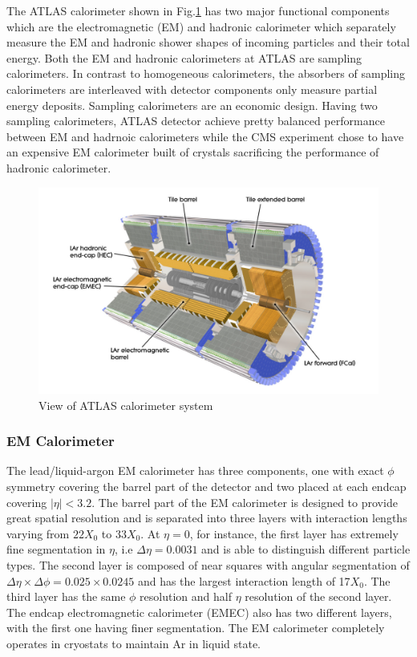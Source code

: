 \label{sec:detector-calo}

The ATLAS calorimeter shown in Fig.\ref{fig:detector-calo} has two major functional components which are the electromagnetic (EM) and hadronic calorimeter which separately measure the EM and hadronic shower shapes of incoming particles and their total energy. Both the EM and hadronic calorimeters at ATLAS are sampling calorimeters. In contrast to homogeneous calorimeters, the absorbers of sampling calorimeters are interleaved with detector components only measure partial energy deposits. Sampling calorimeters are an economic design. Having two sampling calorimeters, ATLAS detector achieve pretty balanced performance between EM and hadrnoic calorimeters while the CMS experiment chose to have an expensive EM calorimeter built of crystals sacrificing the performance of hadronic calorimeter. 


\begin{figure}[htpb!]
\begin{center}
  \includegraphics[width=0.9\linewidth]{figures/detector/calo}
\caption{View of ATLAS calorimeter system \cite{LARReadout}}
\label{fig:detector-calo}
\end{center}
\end{figure}

 
\subsubsection{EM Calorimeter}

The lead/liquid-argon EM calorimeter has three components\cite{ATLASDetector}, one with exact $\phi$ symmetry covering the barrel part of the detector and two placed at each endcap covering $|\eta|<3.2$. The barrel part of the EM calorimeter is designed to provide great spatial resolution and is separated into three layers with interaction lengths varying from $22X_0$ to $33X_0$. At $\eta =0$, for instance, the first layer has extremely fine segmentation in $\eta$, i.e $\Delta \eta = 0.0031$ and is able to distinguish different particle types. The second layer is composed of near squares with angular segmentation of $\Delta \eta \times \Delta \phi = 0.025 \times 0.0245$ and has the largest interaction length of 17$X_0$. The third layer has the same $\phi$ resolution and half $\eta$ resolution of the second layer. 
The endcap electromagnetic calorimeter (EMEC) also has two different layers, with the first one having finer segmentation. The EM calorimeter completely operates in cryostats to maintain Ar in liquid state.

